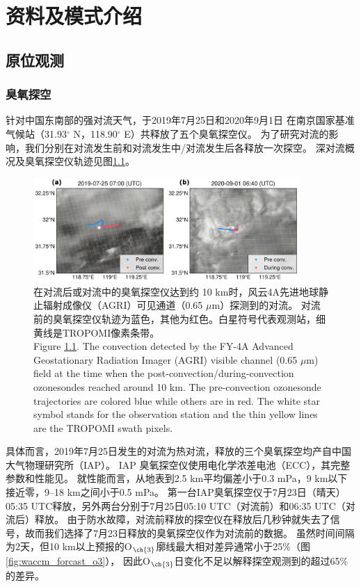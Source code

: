 
\chapter{资料及模式介绍}

\section{原位观测}

\subsection{臭氧探空}

针对中国东南部的强对流天气，于2019年7月25日和2020年9月1日
在南京国家基准气候站（31.93$^{\circ}$ N，118.90$^{\circ}$ E）共释放了五个臭氧探空仪。
为了研究对流的影响，我们分别在对流发生前和对流发生中/对流发生后各释放一次探空。
深对流概况及臭氧探空仪轨迹见图\ref{fig:ozonesonde}。

\begin{figure}[H]
\centering
\includegraphics[width=0.9\textwidth]{./figures/ozonesonde.png}
\caption{在对流后或对流中的臭氧探空仪达到约 10 km时，风云4A先进地球静止辐射成像仪（AGRI）可见通道（0.65 $\mu$m）探测到的对流。
对流前的臭氧探空仪轨迹为蓝色，其他为红色。白星符号代表观测站，细黄线是TROPOMI像素条带。\\
Figure \ref{fig:ozonesonde}. The convection detected by the FY-4A Advanced Geostationary Radiation Imager (AGRI)
visible channel (0.65 $\mu$m) field at the time when the post-convection/during-convection ozonesondes reached around 10 km.
The pre-convection ozonesonde trajectories are colored blue while others are in red.
The white star symbol stands for the observation station and the thin yellow lines are the TROPOMI swath pixels.
}
\label{fig:ozonesonde}
\end{figure}


具体而言，2019年7月25日发生的对流为热对流，释放的三个臭氧探空均产自中国大气物理研究所（IAP）。
IAP 臭氧探空仪使用电化学浓差电池（ECC），其完整参数和性能见\citet{Zhang.2014}。
就性能而言，从地表到2.5 km平均偏差小于0.3 mPa，9 km以下接近零，9--18 km之间小于0.5 mPa。
第一台IAP臭氧探空仪于7月23日（晴天）05:35 UTC释放，另外两台分别于7月25日05:10 UTC（对流前）和06:35 UTC（对流后）释放。
由于防水故障，对流前释放的探空仪在释放后几秒钟就失去了信号，故而我们选择了7月23日释放的臭氧探空仪作为对流前的数据。
虽然时间间隔为2天，但10 km以上预报的O$_{\ch{3}}$廓线最大相对差异通常小于25\%（图\ref{fig:waccm_forcast_o3}），
因此O$_{\ch{3}}$日变化不足以解释探空观测到的超过65\%的差异。


